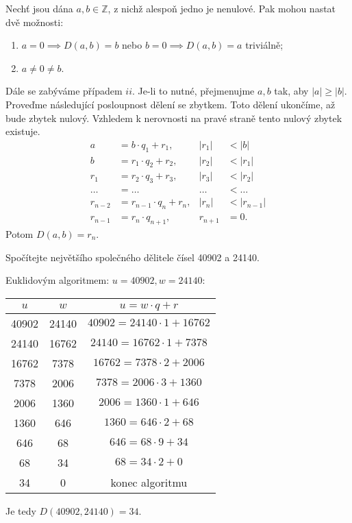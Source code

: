 \begin{definition}\label{eukliduvalg}
Nechť jsou dána $a,b \in \mathbb Z$, z nichž alespoň jedno je nenulové. Pak mohou nastat dvě možnosti:
\begin{enumerate}[$i.$]
  \item $a = 0 \implies D(a, b) = b$ nebo $b=0 \implies D(a,b)=a$ triviálně;
  \item $a \ne 0 \ne b$.
\end{enumerate}
Dále se zabýváme případem $ii$. Je-li to nutné, přejmenujme $a,b$ tak, aby $|a|\geq |b|$.
Proveďme následující posloupnost dělení se zbytkem. Toto dělení ukončíme, až bude zbytek nulový.
Vzhledem k nerovnosti na pravé straně tento nulový zbytek existuje.
\begin{align*}
  a & = b \cdot q_1 + r_1,  & |r_1| & < |b| \\
  b & = r_1 \cdot q_2 + r_2, & |r_2| & < |r_1| \\
  r_1 & = r_2 \cdot q_3 + r_3, & |r_3| & < |r_2|\\
  \dots & = \dots & \dots & < \dots\\
  r_{n-2} & = r_{n-1} \cdot q_n + r_n, & |r_n| & < |r_{n-1}| \\
  r_{n-1} & = r_{n} \cdot q_{n+1}, & r_{n+1} & = 0.
\end{align*}
Potom $D(a,b) = r_n$.
\end{definition}

\begin{priklad}
  Spočítejte největšího společného dělitele čísel 40902 a 24140.
\end{priklad}

\begin{reseni}
  Euklidovým algoritmem: $u = 40902, w = 24140:$
  \begin{center}
    \begin{tabular}{c | c | c}
      $u$ & $w$ & $u=w\cdot q+r$  \\
      \hline
      40902 & 24140 & $40902 = 24140\cdot1 + 16762$ \\
      24140 & 16762 & $24140 = 16762\cdot1 + 7378$ \\
      16762 & 7378 & $16762 = 7378\cdot2 + 2006$  \\
      7378 & 2006 & $7378 = 2006\cdot3 + 1360$  \\
      2006 & 1360 & $2006 = 1360\cdot1 + 646$  \\
      1360 & 646 & $1360 = 646\cdot2 + 68$  \\
      646 & 68 & $646 = 68\cdot9 + 34$  \\
      68 & 34 & $68 = 34\cdot2 + 0$  \\
      34 & 0 & konec algoritmu  \\
    \end{tabular}
  \end{center}
  Je tedy $D(40902, 24140) = 34$.
\end{reseni}

